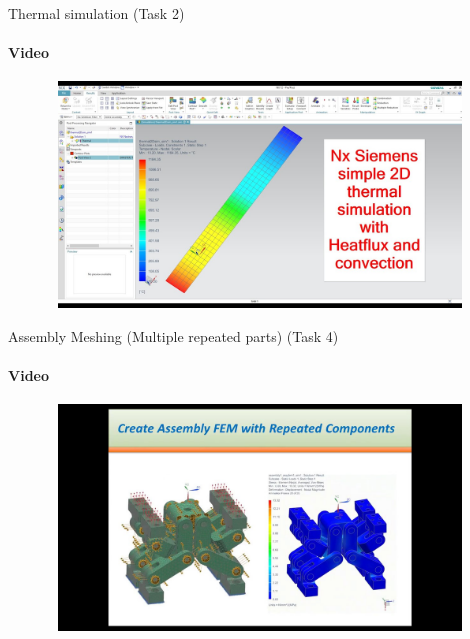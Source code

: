 \documentclass[aspectratio=169]{beamer}
\begin{document}
\begin{frame}[t]{Thermal simulation (Task 2)}
    \framesubtitle{Video}
    \vspace{-0.6cm}
    \begin{figure}[H]
        \href{https://youtu.be/mLqTBOaz9-w}{
            \centering\includegraphics[height=6cm,width=1\textwidth,keepaspectratio]{thermal_sim_video.jpg}}
        \label{fig:thermal_sim_video.jpg}
    \end{figure}
\end{frame}

\begin{frame}[t]{Assembly Meshing (Multiple repeated parts) (Task 4)}
    \framesubtitle{Video}
    \vspace{-0.6cm}
    \begin{figure}[H]
        \href{https://youtu.be/PCvw1kOc5oE}{
            \centering\includegraphics[height=6cm,width=1\textwidth,keepaspectratio]{assembly_meshing_video.jpg}}
        \label{fig:assembly_meshing_video.jpg}
    \end{figure}
\end{frame}
\end{document}
